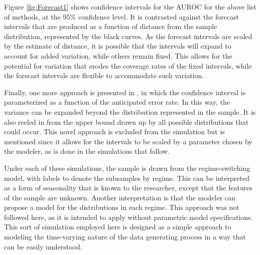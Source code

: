 

Figure \ref{fig:Forecast1} shows confidence intervals for the AUROC for the above list of methods, at the $95\%$ confidence level.
It is contrasted against the forecast intervals that are produced as a function of distance from the sample distribution, represented by the black curves.
%
As the forecast intervals are scaled by the estimate of distance, it is possible that the intervals will expand to account for added variation, while others remain fixed.
%
This allows for the potential for variation that erodes the coverage rates of the fixed intervals, while the forecast intervals are flexible to accommodate such variation.
%





Finally, one more approach is presented in \citet{cortezMohri2004}, in which the confidence interval is parameterized as a function of the anticipated error rate.
In this way, the variance can be expanded beyond the distribution represented in the sample.
It is also reeled in from the upper bound drawn up by all possible distributions that could occur.
This novel approach is excluded from the simulation but is mentioned since it allows for the intervals to be scaled by a parameter chosen by the modeler, as is done in the simulations that follow.







Under each of these simulations, the sample is drawn from the regime-switching model, with labels to denote the subsamples by regime.
%
This can be interpreted as a form of seasonality that is known to the researcher, except that the features of the sample are unknown.
%
Another interpretation is that the modeler can propose a model for the distributions in each regime.
%
This approach was not followed here, as it is intended to apply without parametric model specifications. 
% 
This sort of simulation employed here is designed as a simple approach to modeling the time-varying nature of the data generating process in a way that can be easily understood. 
%

